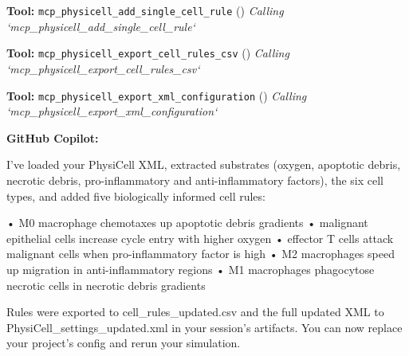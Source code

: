 \documentclass[11pt,a4paper]{article}
\begin{document}
\begin{toolokbox}
\textbf{Tool:} \texttt{mcp\_physicell\_add\_single\_cell\_rule} (\checkmark)
\textit{Calling `mcp\_physicell\_add\_single\_cell\_rule`}
\end{toolokbox}
\begin{toolokbox}
\textbf{Tool:} \texttt{mcp\_physicell\_export\_cell\_rules\_csv} (\checkmark)
\textit{Calling `mcp\_physicell\_export\_cell\_rules\_csv`}
\end{toolokbox}
\begin{toolokbox}
\textbf{Tool:} \texttt{mcp\_physicell\_export\_xml\_configuration} (\checkmark)
\textit{Calling `mcp\_physicell\_export\_xml\_configuration`}
\end{toolokbox}
\begin{copilotbox}
\textbf{GitHub Copilot:}

I’ve loaded your PhysiCell XML, extracted substrates (oxygen, apoptotic debris, necrotic debris, pro-inflammatory and anti-inflammatory factors), the six cell types, and added five biologically informed cell rules:

• M0 macrophage chemotaxes up apoptotic debris gradients  
• malignant epithelial cells increase cycle entry with higher oxygen  
• effector T cells attack malignant cells when pro-inflammatory factor is high  
• M2 macrophages speed up migration in anti-inflammatory regions  
• M1 macrophages phagocytose necrotic cells in necrotic debris gradients

Rules were exported to cell\_rules\_updated.csv and the full updated XML to PhysiCell\_settings\_updated.xml in your session’s artifacts. You can now replace your project’s config and rerun your simulation.

\end{copilotbox}
\end{document}
